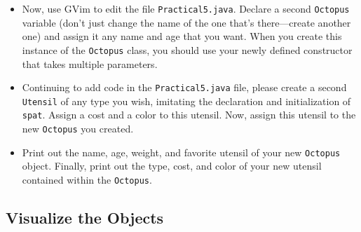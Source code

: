 \begin{enumerate}
\begin{itemize}
\item Now, use GVim to edit the file {\tt Practical5.java}. Declare a second {\tt Octopus} variable (don't just change
    the name of the one that's there---create another one) and assign it any name and age that you want. When you create
  this instance of the {\tt Octopus} class, you should use your newly defined constructor that takes multiple
  parameters.

\item \noindent Continuing to add code in the {\tt Practical5.java} file, please create a second {\tt Utensil} of any
  type you wish, imitating the declaration and initialization of {\tt spat}.  Assign a cost and a color to this utensil.
  Now, assign this utensil to the new {\tt Octopus} you created. 

\item \noindent Print out the name, age, weight, and favorite utensil of your new {\tt Octopus} object. Finally, print
  out the type, cost, and color of your new utensil contained within the {\tt Octopus}.

\end{itemize}
\end{enumerate}

\vspace*{-.30in}
\subsection*{Visualize the Objects} 
\vspace*{-.1in}

